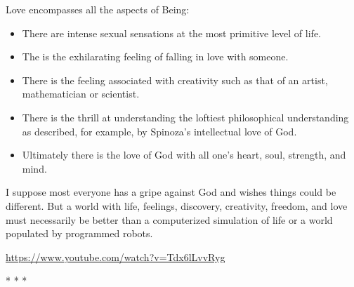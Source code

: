 Love encompasses all the aspects of Being:

\begin{itemize}


\item There are intense sexual sensations at the most primitive level of life.

\item The is the exhilarating feeling of falling in love with someone.

\item There is the feeling associated with creativity such as that of an artist, mathematician or scientist.

\item There is the thrill at understanding the loftiest philosophical understanding as described, for example, by Spinoza's intellectual love of God.

\item Ultimately there is the love of God with all one's heart, soul, strength, and mind.
\end{itemize}


I suppose most everyone has a gripe against God and wishes things could be different. But a world with life, feelings, discovery, creativity, freedom, and love must necessarily be better than a computerized simulation of life or a world populated by programmed robots.

\url{https://www.youtube.com/watch?v=Tdx6lLvvRyg} 


\begin{center}* * *\end{center}

